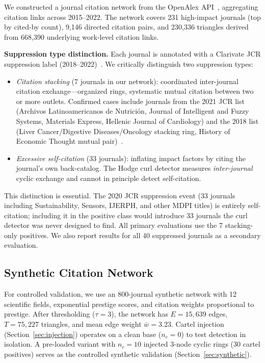 \documentclass[twocolumn,11pt,letterpaper]{article}
\begin{document}
We constructed a journal citation network from the OpenAlex
API~\cite{Priem2022}, aggregating citation links across 2015--2022. The
network covers 231 high-impact journals (top by cited-by count), 9,146
directed citation pairs, and 230,336 triangles derived from 668,390 underlying
work-level citation links.

\smallskip\noindent\textbf{Suppression type distinction.} Each journal is
annotated with a Clarivate JCR suppression label
(2018--2022)~\cite{JCRData2022}. We critically distinguish two suppression
types:

\begin{itemize}
  \item \emph{Citation stacking} (7 journals in our network): coordinated
    inter-journal citation exchange---organized rings, systematic mutual
    citation between two or more outlets. Confirmed cases include journals from
    the 2021 JCR list (Archivos Latinoamericanos de Nutrici\'{o}n, Journal of
    Intelligent and Fuzzy Systems, Materials Express, Hellenic Journal of
    Cardiology) and the 2018 list (Liver Cancer/Digestive Diseases/Oncology
    stacking ring, History of Economic Thought mutual pair)~\cite{StackingAnnotations2024}.
  \item \emph{Excessive self-citation} (33 journals): inflating impact factors
    by citing the journal's own back-catalog. The Hodge curl detector measures
    \emph{inter-journal} cyclic exchange and cannot in principle detect
    self-citation.
\end{itemize}

This distinction is essential. The 2020 JCR suppression event (33 journals
including Sustainability, Sensors, IJERPH, and other MDPI titles) is entirely
self-citation; including it in the positive class would introduce 33 journals
the curl detector was never designed to find. All primary evaluations use the
7 stacking-only positives. We also report results for all 40 suppressed
journals as a secondary evaluation.

\subsection{Synthetic Citation Network}

For controlled validation, we use an 800-journal synthetic network with 12
scientific fields, exponential prestige scores, and citation weights
proportional to prestige. After thresholding ($\tau = 3$), the network has
$E = 15{,}639$ edges, $T = 75{,}227$ triangles, and mean edge weight
$\bar{w} = 3.23$. Cartel injection (Section~\ref{sec:injection}) operates on a
clean base ($n_c = 0$) to test detection in isolation. A pre-loaded variant
with $n_c = 10$ injected 3-node cyclic rings (30 cartel positives) serves as
the controlled synthetic validation (Section~\ref{sec:synthetic}).
\end{document}
